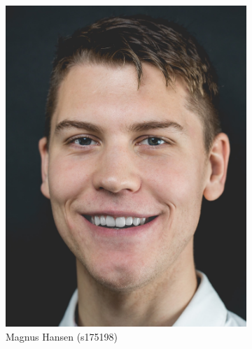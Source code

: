 \begin{figure}[H]
\begin{subfigure}{0.25\textwidth}
		\includegraphics[width=\linewidth]{graphics/members/magnus}
		\caption*{Magnus Hansen (s175198)}
	\end{subfigure}\hfil
	\begin{subfigure}{0.25\textwidth}

\end{subfigure}
\end{figure}
